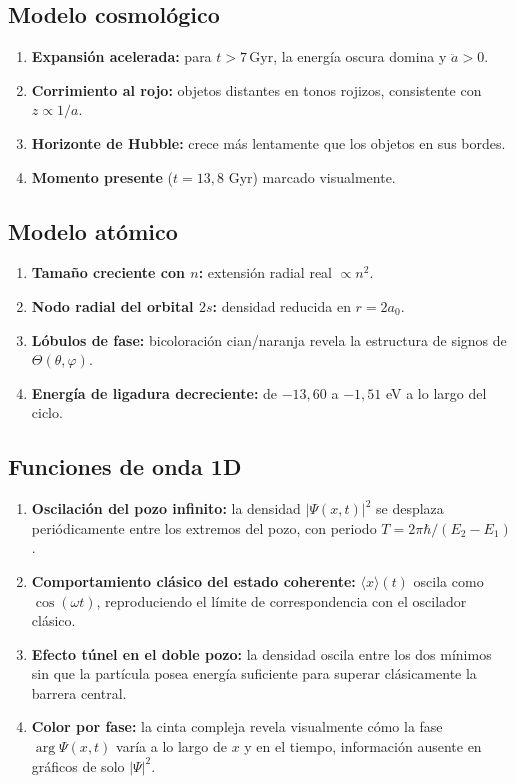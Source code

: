 \documentclass[12pt, a4paper]{article}
\begin{document}
\subsection{Modelo cosmológico}

\begin{enumerate}
  \item \textbf{Expansión acelerada:} para $t > 7\,\text{Gyr}$, la
        energía oscura domina y $\ddot a > 0$.
  \item \textbf{Corrimiento al rojo:} objetos distantes en tonos
        rojizos, consistente con $z \propto 1/a$.
  \item \textbf{Horizonte de Hubble:} crece más lentamente que los
        objetos en sus bordes.
  \item \textbf{Momento presente} ($t=13{,}8$ Gyr) marcado
        visualmente.
\end{enumerate}

\subsection{Modelo atómico}

\begin{enumerate}
  \item \textbf{Tamaño creciente con $n$:} extensión radial real
        $\propto n^2$.
  \item \textbf{Nodo radial del orbital $2s$:} densidad reducida en
        $r=2a_0$.
  \item \textbf{Lóbulos de fase:} bicoloración cian/naranja revela la
        estructura de signos de $\Theta(\theta,\varphi)$.
  \item \textbf{Energía de ligadura decreciente:} de $-13{,}60$ a
        $-1{,}51$ eV a lo largo del ciclo.
\end{enumerate}

\subsection{Funciones de onda 1D}

\begin{enumerate}
  \item \textbf{Oscilación del pozo infinito:} la densidad
        $|\Psi(x,t)|^2$ se desplaza periódicamente entre los extremos
        del pozo, con periodo $T=2\pi\hbar/(E_2-E_1)$.
  \item \textbf{Comportamiento clásico del estado coherente:}
        $\langle x\rangle(t)$ oscila como $\cos(\omega t)$,
        reproduciendo el límite de correspondencia con el oscilador
        clásico.
  \item \textbf{Efecto túnel en el doble pozo:} la densidad oscila
        entre los dos mínimos sin que la partícula posea energía
        suficiente para superar clásicamente la barrera central.
  \item \textbf{Color por fase:} la cinta compleja revela visualmente
        cómo la fase $\arg\Psi(x,t)$ varía a lo largo de $x$ y en el
        tiempo, información ausente en gráficos de solo $|\Psi|^2$.
\end{enumerate}
\end{document}
